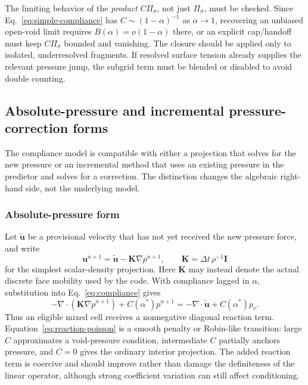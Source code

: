 \documentclass[11pt]{article}
\newcommand{\Dt}{\Delta t}
\newcommand{\divg}{\nabla\!\cdot}
\newcommand{\uv}{\boldsymbol{u}}
\begin{document}
The limiting behavior of the \emph{product} \(C\Pi_\sigma\), not just
\(\Pi_\sigma\), must be checked.  Since Eq.~\eqref{eq:simple-compliance} has
\(C\sim(1-\alpha)^{-1}\) as \(\alpha\to1\), recovering an unbiased open-void limit
requires \(B(\alpha)=o(1-\alpha)\) there, or an explicit cap/handoff must keep
\(C\Pi_\sigma\) bounded and vanishing.  The closure should be applied only to isolated,
underresolved fragments.  If resolved surface tension already supplies the relevant
pressure jump, the subgrid term must be blended or disabled to avoid double counting.

\subsection{Absolute-pressure and incremental pressure-correction forms}

The compliance model is compatible with either a projection that solves for the new
pressure or an incremental method that uses an existing pressure in the predictor and
solves for a correction.  The distinction changes the algebraic right-hand side, not the
underlying model.

\subsubsection{Absolute-pressure form}

Let \(\widetilde{\uv}\) be a provisional velocity that has not yet received the new
pressure force, and write
\begin{equation}
  \uv^{n+1}=\widetilde{\uv}-\boldsymbol{K}\nabla p^{n+1},
  \qquad
  \boldsymbol{K}=\Dt\,\rho^{-1}\boldsymbol{I}
  \label{eq:absolute-update}
\end{equation}
for the simplest scalar-density projection.  Here \(\boldsymbol K\) may instead denote
the actual discrete face mobility used by the code.  With compliance lagged in
\(\alpha\), substitution into Eq.~\eqref{eq:compliance} gives
\begin{equation}
  \boxed{
  -\divg\!\left(\boldsymbol{K}\nabla p^{n+1}\right)
  +C(\alpha^*)p^{n+1}
  =-\divg\widetilde{\uv}+C(\alpha^*)p_v.}
  \label{eq:reaction-poisson}
\end{equation}
Thus an eligible mixed cell receives a nonnegative diagonal reaction term.
Equation~\eqref{eq:reaction-poisson} is a smooth penalty or Robin-like transition:
large \(C\) approximates a void-pressure condition, intermediate \(C\) partially anchors
pressure, and \(C=0\) gives the ordinary interior projection.  The added reaction term is
coercive and should improve rather than damage the definiteness of the linear operator,
although strong coefficient variation can still affect conditioning.
\end{document}
